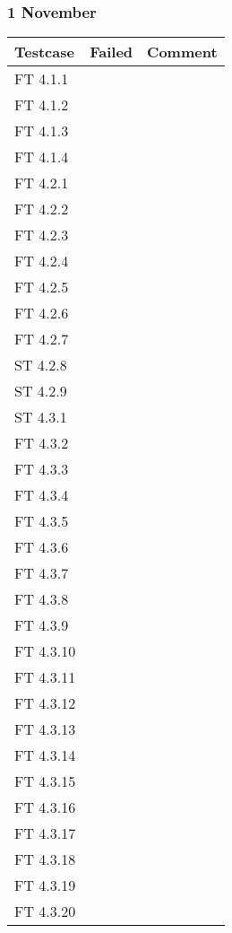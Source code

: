 \documentclass[a4paper]{article}
\begin{document}
\subsubsection{1 November}
\begin{tabular}{| l | l | p{11cm} |}
\hline
Testcase &  Failed & Comment\\
\hline
FT 4.1.1 & & \\
\hline
FT 4.1.2 & & \\
\hline
FT 4.1.3 & & \\
\hline
FT 4.1.4 & & \\
\hline
FT 4.2.1 & & \\
\hline
FT 4.2.2 & & \\
\hline
FT 4.2.3 & & \\
\hline
FT 4.2.4 & & \\
\hline
FT 4.2.5 & & \\
\hline
FT 4.2.6 & & \\
\hline
FT 4.2.7 & & \\
\hline
ST 4.2.8 & & \\
\hline
ST 4.2.9 & & \\
\hline
ST 4.3.1 & & \\
\hline
FT 4.3.2 & & \\
\hline
FT 4.3.3 & &  \\
\hline
FT 4.3.4 & & \\
\hline
FT 4.3.5 & & \\
\hline
FT 4.3.6 & & \\
\hline
FT 4.3.7 & & \\
\hline
FT 4.3.8 & & \\
\hline
FT 4.3.9 & & \\
\hline
FT 4.3.10 & & \\
\hline
FT 4.3.11 & & \\
\hline
FT 4.3.12 & & \\
\hline
FT 4.3.13 & & \\
\hline
FT 4.3.14 & & \\
\hline
FT 4.3.15 & & \\
\hline
FT 4.3.16 & & \\
\hline
FT 4.3.17 & & \\
\hline
FT 4.3.18 & & \\
\hline
FT 4.3.19 & & \\
\hline
FT 4.3.20 & & \\
\end{tabular}
\end{document}
